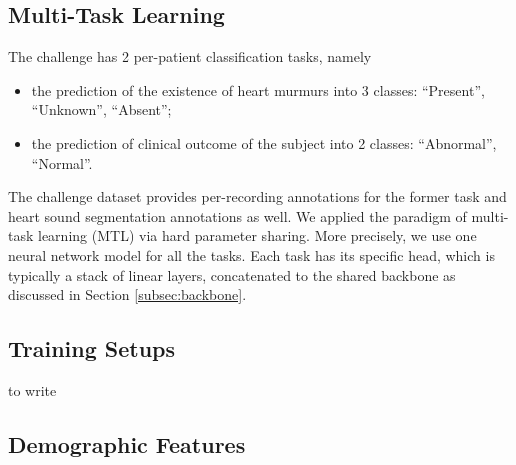 \subsection{Multi-Task Learning}
\label{subsec:mtl}

The challenge has 2 per-patient classification tasks, namely
\begin{itemize}
    \item the prediction of the existence of heart murmurs into 3 classes: ``Present'', ``Unknown'', ``Absent'';
    \item the prediction of clinical outcome of the subject into 2 classes: ``Abnormal'', ``Normal''.
\end{itemize}
The challenge dataset \cite{Oliveira_2021_CirCor} provides per-recording annotations for the former task and heart sound segmentation annotations as well. We applied the paradigm of multi-task learning (MTL) \cite{Caruana_1997_mtl} via hard parameter sharing. More precisely, we use one neural network model for all the tasks. Each task has its specific head, which is typically a stack of linear layers, concatenated to the shared backbone as discussed in Section \ref{subsec:backbone}.

\subsection{Training Setups}
\label{subsec:training}

to write


\subsection{Demographic Features}
\label{subsec:demo_feat}

